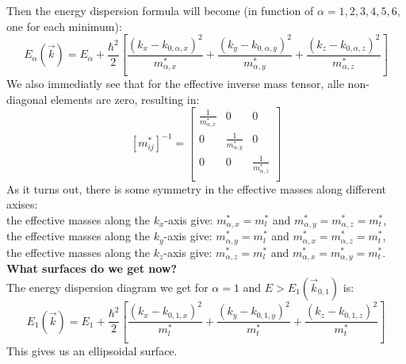 {\begin{center}
	\end{center}
	Then the energy dispersion formula will become (in function of $\alpha = 1, 2, 3, 4, 5, 6$, one for each minimum):
	\begin{equation}
		E_{\alpha}(\vec{k}) = E_{\alpha} + \frac{\hbar^2}{2}\left[\frac{(k_x - k_{0, \alpha, x})^2}{m^*_{\alpha, x}} + \frac{(k_y - k_{0, \alpha, y})^2}{m^*_{\alpha, y}} + \frac{(k_z - k_{0, \alpha, z})^2}{m^*_{\alpha, z}}\right]
	\end{equation}
	We also immediatly see that for the effective inverse mass tensor, alle non-diagonal elements are zero, resulting in:
	\begin{equation}
		\left[m^*_{ij}\right]^{-1} = \left[
		\begin{array}{ccc}
			\frac{1}{m^*_{\alpha, x}} & 0 & 0 \\
			0 & \frac{1}{m^*_{\alpha, y}} & 0 \\
			0 & 0 & \frac{1}{m^*_{\alpha, z}}\\
		\end{array}
		\right]
	\end{equation}
	As it turns out, there is some symmetry in the effective masses along different axises:\\
	\quad the effective masses along the $k_x$-axis give: $m^*_{\alpha, x} = m^*_l$ and $m^*_{\alpha, y} = m^*_{\alpha, z} = m^*_t$, \\
	\quad the effective masses along the $k_y$-axis give: $m^*_{\alpha, y} = m^*_l$ and $m^*_{\alpha, x} = m^*_{\alpha, z} = m^*_t$, \\
	\quad the effective masses along the $k_z$-axis give: $m^*_{\alpha, z} = m^*_l$ and $m^*_{\alpha, x} = m^*_{\alpha, y} = m^*_t$. \\ \newline
	\textbf{What surfaces do we get now?} \\
	The energy dispersion diagram we get for $\alpha = 1$ and $E > E_1(\vec{k}_{0, 1})$ is:
	\begin{equation}
		E_{1}(\vec{k}) = E_{1} + \frac{\hbar^2}{2}\left[\frac{(k_x - k_{0, 1, x})^2}{m^*_l} + \frac{(k_y - k_{0, 1, y})^2}{m^*_t} + \frac{(k_z - k_{0, 1, z})^2}{m^*_t}\right]
	\end{equation}
	This gives us an ellipsoidal surface.
}
